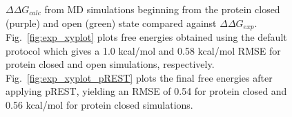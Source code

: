 \documentclass[T4paper.tex]{subfiles}
\begin{document}
\begin{figure}[!h]
\begin{subfigure}{.5\textwidth}
\end{subfigure}\hfill
\caption{$\Delta\Delta G_{calc}$ from MD simulations beginning from the protein closed (purple) and open (green) state compared against $\Delta\Delta G_{exp}$. Fig.~\ref{fig:exp_xyplot} plots free energies obtained using the default protocol which gives a 1.0 kcal/mol and 0.58 kcal/mol RMSE for protein closed and open simulations, respectively. Fig.~\ref{fig:exp_xyplot_pREST} plots the final free energies after applying pREST, yielding an RMSE of 0.54 for protein closed and 0.56 kcal/mol for protein closed simulations.} 
\label{fig:exp-xyplots}
\end{figure}
\end{document}
